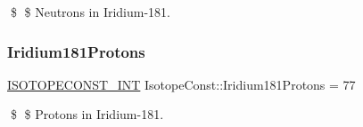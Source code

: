 \$ \$ Neutrons in Iridium-\/181. \mbox{\label{group___isotope_const-_iridium-_ir181_ga58ead8a15ffbc38d2db26fa635557cc8}} 
\subsubsection{\texorpdfstring{Iridium181\+Protons}{Iridium181Protons}}
{\footnotesize\ttfamily \mbox{\hyperlink{group___isotope_const-_macros_ga5f18360b3e99483a35c32d789e62621c}{I\+S\+O\+T\+O\+P\+E\+C\+O\+N\+S\+T\+\_\+\+I\+NT}} Isotope\+Const\+::\+Iridium181\+Protons = 77}

\$ \$ Protons in Iridium-\/181. 